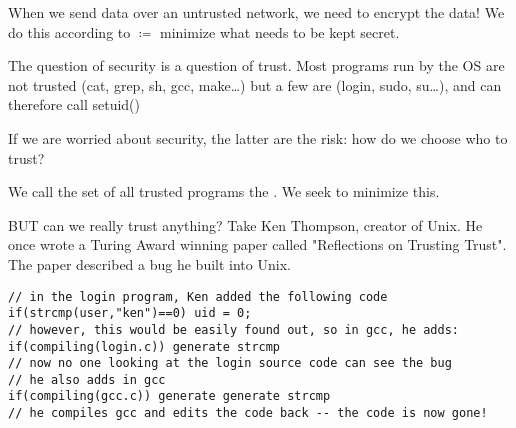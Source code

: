 \documentclass[../../lecture_notes.tex]{subfiles}
\begin{document}
When we send data over an untrusted network, we need to encrypt the data! We do this according to  $\coloneqq$ minimize what needs to be kept secret.

\begin{center}
\end{center}


The question of security is a question of trust. Most programs run by the OS are not trusted (cat, grep, sh, gcc, make…) but a few are (login, sudo, su…), and can therefore call setuid()

If we are worried about security, the latter are the risk: how do we choose who to trust?

\begin{minipage}{0.4\linewidth}
\centering
{}
\end{minipage}%
\begin{minipage}{0.6\linewidth}
We call the set of all trusted programs the . We seek to minimize this.
\end{minipage}

BUT can we really trust anything? Take Ken Thompson, creator of Unix. He once wrote a Turing Award winning paper called "Reflections on Trusting Trust". The paper described a bug he built into Unix.
\begin{lstlisting}
// in the login program, Ken added the following code
if(strcmp(user,"ken")==0) uid = 0;
// however, this would be easily found out, so in gcc, he adds:
if(compiling(login.c)) generate strcmp
// now no one looking at the login source code can see the bug
// he also adds in gcc
if(compiling(gcc.c)) generate generate strcmp
// he compiles gcc and edits the code back -- the code is now gone!
\end{lstlisting}
\end{document}
